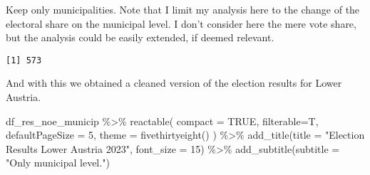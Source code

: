\documentclass[
  letterpaper,
  DIV=11,
  numbers=noendperiod,
  oneside]{scrartcl}
\newenvironment{Shaded}{\begin{snugshade}}{\end{snugshade}}
\newcommand{\AttributeTok}[1]{\textcolor[rgb]{0.40,0.45,0.13}{#1}}
\newcommand{\CommentTok}[1]{\textcolor[rgb]{0.37,0.37,0.37}{#1}}
\newcommand{\ConstantTok}[1]{\textcolor[rgb]{0.56,0.35,0.01}{#1}}
\newcommand{\DecValTok}[1]{\textcolor[rgb]{0.68,0.00,0.00}{#1}}
\newcommand{\FunctionTok}[1]{\textcolor[rgb]{0.28,0.35,0.67}{#1}}
\newcommand{\NormalTok}[1]{\textcolor[rgb]{0.00,0.23,0.31}{#1}}
\newcommand{\OtherTok}[1]{\textcolor[rgb]{0.00,0.23,0.31}{#1}}
\newcommand{\SpecialCharTok}[1]{\textcolor[rgb]{0.37,0.37,0.37}{#1}}
\newcommand{\StringTok}[1]{\textcolor[rgb]{0.13,0.47,0.30}{#1}}
\begin{document}
Keep only municipalities. Note that I limit my analysis here to the
change of the electoral share on the municipal level. I don't consider
here the mere vote share, but the analysis could be easily extended, if
deemed relevant.

\begin{Shaded}
\end{Shaded}

\begin{verbatim}
[1] 573
\end{verbatim}

And with this we obtained a cleaned version of the election results for
Lower Austria.

\begin{Shaded}
\begin{Highlighting}[]
\NormalTok{df\_res\_noe\_municip }\SpecialCharTok{\%\textgreater{}\%} 
  \FunctionTok{reactable}\NormalTok{(}
    \AttributeTok{compact =} \ConstantTok{TRUE}\NormalTok{, }
    \AttributeTok{filterable=}\NormalTok{T,}
    \AttributeTok{defaultPageSize =} \DecValTok{5}\NormalTok{, }
    \AttributeTok{theme =} \FunctionTok{fivethirtyeight}\NormalTok{()}
\NormalTok{  ) }\SpecialCharTok{\%\textgreater{}\%}
  \FunctionTok{add\_title}\NormalTok{(}\AttributeTok{title =} \StringTok{"Election Results Lower Austria 2023"}\NormalTok{, }\AttributeTok{font\_size =} \DecValTok{15}\NormalTok{) }\SpecialCharTok{\%\textgreater{}\%} 
  \FunctionTok{add\_subtitle}\NormalTok{(}\AttributeTok{subtitle =} \StringTok{"Only municipal level."}\NormalTok{)}
\end{Highlighting}
\end{Shaded}
\end{document}
